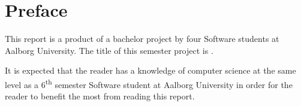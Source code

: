 \chapter*{Preface}
This report is a product of a bachelor project by four Software students at Aalborg University. The title of this semester project is \projecttheme.

It is expected that the reader has a knowledge of computer science at the same level as a 6\textsuperscript{th} semester Software student at Aalborg University in order for the reader to benefit the most from reading this report.